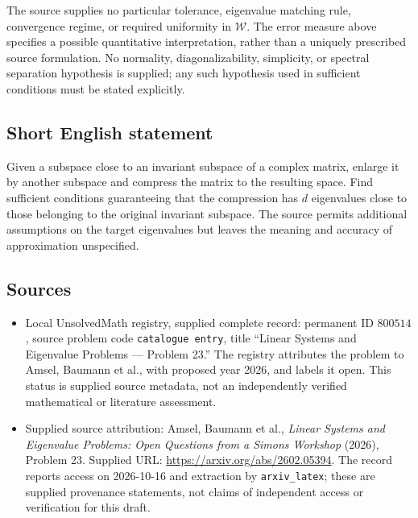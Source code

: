 \documentclass[11pt]{article}
\begin{document}
The source supplies no particular tolerance, eigenvalue matching rule, convergence regime, or required uniformity in \(\mathcal W\). The error measure above specifies a possible quantitative interpretation, rather than a uniquely prescribed source formulation. No normality, diagonalizability, simplicity, or spectral separation hypothesis is supplied; any such hypothesis used in sufficient conditions must be stated explicitly.
\subsection{Short English statement}
Given a subspace close to an invariant subspace of a complex matrix, enlarge it by another subspace and compress the matrix to the resulting space. Find sufficient conditions guaranteeing that the compression has \(d\) eigenvalues close to those belonging to the original invariant subspace. The source permits additional assumptions on the target eigenvalues but leaves the meaning and accuracy of approximation unspecified.
\subsection{Sources}
\begin{itemize}
\item Local UnsolvedMath registry, supplied complete record: permanent ID \(800514\), source problem code \texttt{catalogue entry}, title ``Linear Systems and Eigenvalue Problems --- Problem 23.'' The registry attributes the problem to Amsel, Baumann et al., with proposed year 2026, and labels it open. This status is supplied source metadata, not an independently verified mathematical or literature assessment.
\item Supplied source attribution: Amsel, Baumann et al., \emph{Linear Systems and Eigenvalue Problems: Open Questions from a Simons Workshop} (2026), Problem 23. Supplied URL: \url{https://arxiv.org/abs/2602.05394}. The record reports access on 2026-10-16 and extraction by \texttt{arxiv\_latex}; these are supplied provenance statements, not claims of independent access or verification for this draft.
\end{itemize}
\end{document}
